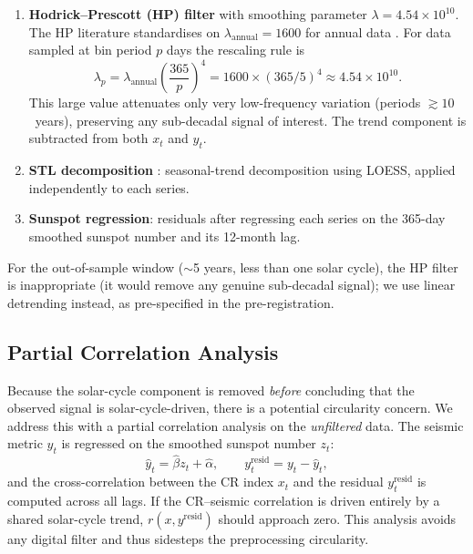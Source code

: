 \documentclass[12pt,a4paper]{article}
\begin{document}
\begin{enumerate}
  \item \textbf{Hodrick--Prescott (HP) filter} \citep{HP1997} with smoothing
    parameter $\lambda = 4.54 \times 10^{10}$.
    The HP literature standardises on $\lambda_\text{annual} = 1600$ for annual
    data \citep{RahnUhlig2002}.
    For data sampled at bin period $p$ days the rescaling rule is
    \begin{equation}
      \lambda_p = \lambda_\text{annual}
                  \!\left(\frac{365}{p}\right)^{\!4}
                  = 1600 \times (365/5)^4
                  \approx 4.54 \times 10^{10}.
      \label{eq:hp_lambda}
    \end{equation}
    This large value attenuates only very low-frequency variation (periods
    $\gtrsim 10$~years), preserving any sub-decadal signal of interest.
    The trend component is subtracted from both $x_t$ and $y_t$.

  \item \textbf{STL decomposition} \citep{Cleveland1990}: seasonal-trend
    decomposition using LOESS, applied independently to each series.

  \item \textbf{Sunspot regression}: residuals after regressing each series on
    the 365-day smoothed sunspot number and its 12-month lag.
\end{enumerate}

For the out-of-sample window ($\sim$5 years, less than one solar cycle), the
HP filter is inappropriate (it would remove any genuine sub-decadal signal);
we use linear detrending instead, as pre-specified in the pre-registration.

\subsection{Partial Correlation Analysis}
\label{sec:methods:partialcorr}

Because the solar-cycle component is removed \emph{before} concluding that the
observed signal is solar-cycle-driven, there is a potential circularity concern.
We address this with a partial correlation analysis on the \emph{unfiltered} data.
The seismic metric $y_t$ is regressed on the smoothed sunspot number $z_t$:
\begin{equation}
  \hat{y}_t = \hat{\beta} z_t + \hat{\alpha}, \qquad
  y_t^\text{resid} = y_t - \hat{y}_t,
  \label{eq:partialcorr}
\end{equation}
and the cross-correlation between the CR index $x_t$ and the residual
$y_t^\text{resid}$ is computed across all lags.
If the CR--seismic correlation is driven entirely by a shared solar-cycle trend,
$r(x, y^\text{resid})$ should approach zero.
This analysis avoids any digital filter and thus sidesteps the preprocessing
circularity.
\end{document}
